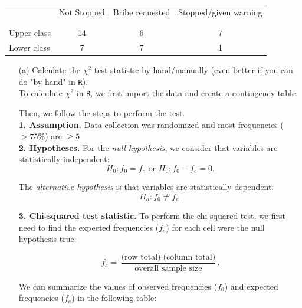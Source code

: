 \documentclass[12pt,letterpaper]{article}
\begin{document}
	\newpage

	\begin{table}[h!]
		\centering
		\begin{tabular}{l | c c c }
			& Not Stopped & Bribe requested & Stopped/given warning \\
			\\[-1.8ex] 
			\hline \\[-1.8ex]
			Upper class & 14 & 6 & 7 \\
			Lower class & 7 & 7 & 1 \\
			\hline
		\end{tabular}
	\end{table}

	\begin{enumerate}
	
		\item [(a)]
		Calculate the $\chi^2$ test statistic by hand/manually (even better if you can do "by hand" in \texttt{R}).\\
		
		To calculate $\chi^2$ in \texttt{R}, we first import the data and create a contingency table:
		
				
		
		Then, we follow the steps to perform the test.\\
		
		\textbf{1. Assumption.} Data collection was randomized and most frequencies ($>75\%$) are $\ge 5$\\
		
		\textbf{2. Hypotheses.} For the \textit{null hypothesis}, we consider that variables are statistically independent: $$H_0: f_0 = f_e \text{ or } H_0: f_0 - f_e=0.$$
		
		The \textit{alternative hypothesis} is that variables are statistically dependent: $$H_a: f_0 \neq f_e.$$
		
		\textbf{3. Chi-squared test statistic.} To perform the chi-squared test, we first need to find the expected frequencies ($f_e$) for each cell were the null hypothesis true:
			
			$$f_e = \frac{\text{(row total)} \cdot \text{(column total)}}{\text{overall sample size}}.$$
			
			
		
		We can summarize the values of observed frequencies ($f_0$) and expected frequencies ($f_e$) in the following table:
		

\end{enumerate}
\end{document}
